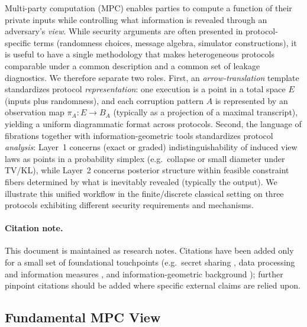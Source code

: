 \documentclass[11pt,a4paper]{article}
\theoremstyle{definition}
\theoremstyle{plain}
\begin{document}
Multi-party computation (MPC) enables parties to compute a function of their private inputs while controlling what information is revealed through an adversary's \emph{view}. While security arguments are often presented in protocol-specific terms (randomness choices, message algebra, simulator constructions), it is useful to have a single methodology that makes heterogeneous protocols comparable under a common description and a common set of leakage diagnostics. We therefore separate two roles. First, an \emph{arrow-translation} template standardizes protocol \emph{representation}: one execution is a point in a total space $E$ (inputs plus randomness), and each corruption pattern $A$ is represented by an observation map $\pi_A:E\to B_A$ (typically as a projection of a maximal transcript), yielding a uniform diagrammatic format across protocols. Second, the language of fibrations together with information-geometric tools standardizes protocol \emph{analysis}: Layer~1 concerns (exact or graded) indistinguishability of induced view laws as points in a probability simplex (e.g.\ collapse or small diameter under TV/KL), while Layer~2 concerns posterior structure within feasible constraint fibers determined by what is inevitably revealed (typically the output). We illustrate this unified workflow in the finite/discrete classical setting on three protocols exhibiting different security requirements and mechanisms.

\paragraph{Citation note.}
This document is maintained as research notes. Citations have been added only for a small set of foundational touchpoints (e.g.\ secret sharing \cite{Shamir1979}, data processing and information measures \cite{CoverThomas2006}, and information-geometric background \cite{AmariNagaoka2000}); further pinpoint citations should be added where specific external claims are relied upon.

\subsection{Fundamental MPC View}
\end{document}
